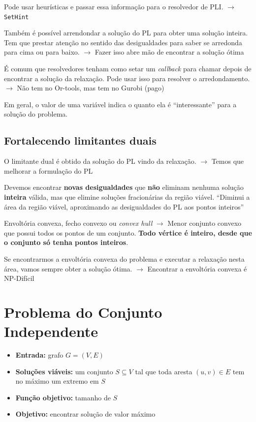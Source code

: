 Pode usar heurísticas e passar essa informação para o resolvedor de PLI. $\rightarrow$ \lstinline{SetHint}

Também é possível arrendondar a solução do PL para obter uma solução inteira. Tem que prestar atenção no sentido das desigualdades para saber se arredonda para cima ou para baixo. $\rightarrow$ Fazer isso abre mão de encontrar a solução ótima

É comum que resolvedores tenham como setar um \textit{callback} para chamar depois de encontrar a solução da relaxação. Pode usar isso para resolver o arredondamento. $\rightarrow$ Não tem no Or-tools, mas tem no Gurobi (pago)

Em geral, o valor de uma variável indica o quanto ela é ``interessante'' para a solução do problema.

\subsection{Fortalecendo limitantes duais}

O limitante dual é obtido da solução do PL vindo da relaxação. $\rightarrow$ Temos que melhorar a formulação do PL

Devemos encontrar \textbf{novas desigualdades} que \textbf{não} eliminam nenhuma solução \textbf{inteira} válida, mas que elimine soluções fracionárias da região viável. ``Diminui a área da região viável, aproximando as desigualdades do PL aos pontos inteiros''

Envoltória convexa, fecho convexo ou \textit{convex hull} $\rightarrow$ Menor conjunto convexo que possui todos os pontos de um conjunto. \textbf{Todo vértice é inteiro, desde que o conjunto só tenha pontos inteiros}.

Se encontrarmos a envoltória convexa do problema e executar a relaxação nesta área, vamos sempre obter a solução ótima. $\rightarrow$ Encontrar a envoltória convexa é NP-Difícil

\section{Problema do Conjunto Independente}

\begin{itemize}
    \item \textbf{Entrada:} grafo $G = (V, E)$
    \item \textbf{Soluções viáveis:} um conjunto $S \subseteq V$ tal que toda aresta $(u, v) \in E$ tem no máximo um extremo em $S$
    \item \textbf{Função objetivo:} tamanho de $S$
    \item \textbf{Objetivo:} encontrar solução de valor máximo
\end{itemize}

